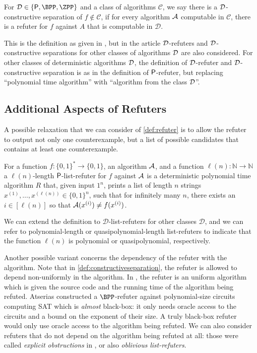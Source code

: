 \begin{definition}
	\label{def:constructiveseparation}
	For $\calD \in \{\PTIME, \BPP, \ZPP\}$ and a class of algorithms $\mathcal{C}$, we say there is a 
	$\mathcal{D}$-constructive separation of $f \not\in \mathcal{C}$, if for every algorithm $\mathcal{A}$ computable
	in $\mathcal{C}$, there is a refuter for $f$ against $A$ that is computable in $\mathcal{D}$. 
\end{definition}

This is the definition as given in \cite[Definition 1.1]{ConstructiveSeparations}, but in the article
$\mathcal{D}$-refuters and $\mathcal{D}$-constructive separations for other classes of algorithms $\mathcal{D}$ are also considered.
For other classes of deterministic algorithms $\mathcal{D}$, the definition of $\mathcal{D}$-refuter and $\mathcal{D}$-constructive 
separation is as in the definition of $\mathsf{P}$-refuter, but replacing ``polynomial time algorithm''
with ``algorithm from the class $\mathcal{D}$''.

\subsection{Additional Aspects of Refuters}

A possible relaxation that we can consider of \cref{def:refuter} is to allow the refuter 
to output not only one counterexample, but a list of possible candidates that contains
at least one counterexample.

\begin{definition}
	For a function $f \colon \{0, 1\}^* \to \{0, 1\}$, an algorithm $\mathcal{A}$,
	and a function $\ell(n) \colon \mathbb{N} \to \mathbb{N}$ 
	a $\ell(n)$-length $\mathsf{P}$-list-refuter for $f$ against $\mathcal{A}$ is a deterministic polynomial time
	algorithm $R$ that, given input $1^n$, prints a list of length $n$ strings
	$x^{(1)}, \ldots, x^{(\ell(n))} \in \{0, 1\}^n$,
	such that for infinitely many $n$, there exists an $i \in [\ell(n)]$ so that 
	$\mathcal{A}(x^{(i)}) \neq f(x^{(i)})$.
\end{definition}

We can extend the definition to $\mathcal{D}$-list-refuters for other classes $\mathcal{D}$,
and we can refer to polynomial-length or quasipolynomial-length list-refuters to indicate that 
the function $\ell(n)$ is polynomial or quasipolynomial, respectively. 

Another possible variant concerns the dependency of the refuter with the algorithm. 
Note that in \cref{def:constructiveseparation}, the refuter is allowed to 
depend non-uniformly in the algorithm. In \cite{Gutfreund05}, the refuter is an uniform
algorithm which is given the source code and the running time of the algorithm being refuted. 
Atserias \cite{Atserias06} constructed a $\BPP$-refuter against polynomial-size circuits 
computing SAT which is \emph{almost} black-box: it only needs oracle access to the circuits
and a bound on the exponent of their size. A truly black-box refuter would only use oracle 
access to the algorithm being refuted. We can also consider refuters that do not depend on the 
algorithm being refuted at all: those were called \emph{explicit obstructions} in \cite{Chen20},
or also \emph{oblivious list-refuters}.

